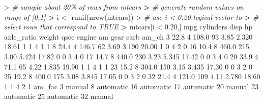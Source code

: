 \documentclass[
]{book}
\newenvironment{Shaded}{\begin{snugshade}}{\end{snugshade}}
\newcommand{\CommentTok}[1]{\textcolor[rgb]{0.56,0.35,0.01}{\textit{#1}}}
\newcommand{\DecValTok}[1]{\textcolor[rgb]{0.00,0.00,0.81}{#1}}
\newcommand{\ErrorTok}[1]{\textcolor[rgb]{0.64,0.00,0.00}{\textbf{#1}}}
\newcommand{\FloatTok}[1]{\textcolor[rgb]{0.00,0.00,0.81}{#1}}
\newcommand{\FunctionTok}[1]{\textcolor[rgb]{0.00,0.00,0.00}{#1}}
\newcommand{\NormalTok}[1]{#1}
\newcommand{\OtherTok}[1]{\textcolor[rgb]{0.56,0.35,0.01}{#1}}
\newcommand{\SpecialCharTok}[1]{\textcolor[rgb]{0.00,0.00,0.00}{#1}}
\begin{document}
\begin{Shaded}
\begin{Highlighting}[]
\SpecialCharTok{\textgreater{}} \CommentTok{\# sample about 20\% of rows from mtcars}
\ErrorTok{\textgreater{}} \CommentTok{\# generate random values on range of [0,1]}
\ErrorTok{\textgreater{}}\NormalTok{ i }\OtherTok{\textless{}{-}} \FunctionTok{runif}\NormalTok{(}\FunctionTok{nrow}\NormalTok{(mtcars))}
\SpecialCharTok{\textgreater{}} \CommentTok{\# use i \textless{} 0.20 logical vector to }
\ErrorTok{\textgreater{}} \CommentTok{\# select rows that correspond to TRUE}
\ErrorTok{\textgreater{}}\NormalTok{ mtcars[i }\SpecialCharTok{\textless{}} \FloatTok{0.20}\NormalTok{,]}
\NormalTok{    mpg cylinders  disp  hp axle\_ratio weight  qsec engine am gear carb am\_ch}
\DecValTok{3}  \FloatTok{22.8}         \DecValTok{4} \FloatTok{108.0}  \DecValTok{93}       \FloatTok{3.85}  \FloatTok{2.320} \FloatTok{18.61}      \DecValTok{1}  \DecValTok{1}    \DecValTok{4}    \DecValTok{1}     \DecValTok{1}
\DecValTok{8}  \FloatTok{24.4}         \DecValTok{4} \FloatTok{146.7}  \DecValTok{62}       \FloatTok{3.69}  \FloatTok{3.190} \FloatTok{20.00}      \DecValTok{1}  \DecValTok{0}    \DecValTok{4}    \DecValTok{2}     \DecValTok{0}
\DecValTok{16} \FloatTok{10.4}         \DecValTok{8} \FloatTok{460.0} \DecValTok{215}       \FloatTok{3.00}  \FloatTok{5.424} \FloatTok{17.82}      \DecValTok{0}  \DecValTok{0}    \DecValTok{3}    \DecValTok{4}     \DecValTok{0}
\DecValTok{17} \FloatTok{14.7}         \DecValTok{8} \FloatTok{440.0} \DecValTok{230}       \FloatTok{3.23}  \FloatTok{5.345} \FloatTok{17.42}      \DecValTok{0}  \DecValTok{0}    \DecValTok{3}    \DecValTok{4}     \DecValTok{0}
\DecValTok{20} \FloatTok{33.9}         \DecValTok{4}  \FloatTok{71.1}  \DecValTok{65}       \FloatTok{4.22}  \FloatTok{1.835} \FloatTok{19.90}      \DecValTok{1}  \DecValTok{1}    \DecValTok{4}    \DecValTok{1}     \DecValTok{1}
\DecValTok{23} \FloatTok{15.2}         \DecValTok{8} \FloatTok{304.0} \DecValTok{150}       \FloatTok{3.15}  \FloatTok{3.435} \FloatTok{17.30}      \DecValTok{0}  \DecValTok{0}    \DecValTok{3}    \DecValTok{2}     \DecValTok{0}
\DecValTok{25} \FloatTok{19.2}         \DecValTok{8} \FloatTok{400.0} \DecValTok{175}       \FloatTok{3.08}  \FloatTok{3.845} \FloatTok{17.05}      \DecValTok{0}  \DecValTok{0}    \DecValTok{3}    \DecValTok{2}     \DecValTok{0}
\DecValTok{32} \FloatTok{21.4}         \DecValTok{4} \FloatTok{121.0} \DecValTok{109}       \FloatTok{4.11}  \FloatTok{2.780} \FloatTok{18.60}      \DecValTok{1}  \DecValTok{1}    \DecValTok{4}    \DecValTok{2}     \DecValTok{1}
\NormalTok{      am\_fac}
\DecValTok{3}\NormalTok{     manual}
\DecValTok{8}\NormalTok{  automatic}
\DecValTok{16}\NormalTok{ automatic}
\DecValTok{17}\NormalTok{ automatic}
\DecValTok{20}\NormalTok{    manual}
\DecValTok{23}\NormalTok{ automatic}
\DecValTok{25}\NormalTok{ automatic}
\DecValTok{32}\NormalTok{    manual}
\end{Highlighting}
\end{Shaded}
\end{document}
